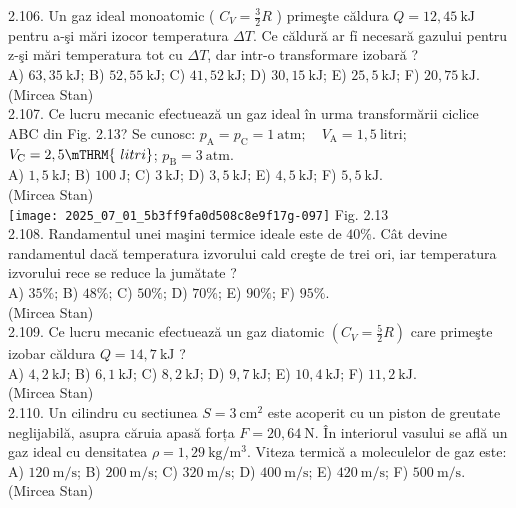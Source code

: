 2.106. Un gaz ideal monoatomic ( $C_{V}=\frac{3}{2} R$ ) primeşte căldura $Q=12,45 \mathrm{~kJ}$ pentru a-şi mări izocor temperatura $\Delta T$. Ce căldură ar fỉ necesară gazului pentru z-şi mări temperatura tot cu $\Delta T$, dar intr-o transformare izobară ?\\ A) $63,35 \mathrm{~kJ}$; B) $52,55 \mathrm{~kJ}$; C) $41,52 \mathrm{~kJ}$; D) $30,15 \mathrm{~kJ}$; E) $25,5 \mathrm{~kJ}$; F) $20,75 \mathrm{~kJ}$.\\ (Mircea Stan)\\

2.107. Ce lucru mecanic efectuează un gaz ideal în urma transformării ciclice ABC din Fig. 2.13? Se cunosc: $p_{\mathrm{A}}=p_{\mathrm{C}}=1 \mathrm{~atm} ; \quad V_{\mathrm{A}}=1,5 \mathrm{~litri}$; $V_{\mathrm{C}}=2,5 \mTHRM{~litri}$; $p_{\mathrm{B}}=3 \mathrm{~atm}$.\\ A) $1,5 \mathrm{~kJ}$; B) $100 \mathrm{~J}$; C) $3 \mathrm{~kJ}$; D) $3,5 \mathrm{~kJ}$; E) $4,5 \mathrm{~kJ}$; F) $5,5 \mathrm{~kJ}$.\\ (Mircea Stan)\\ \texttt{[image: 2025\_07\_01\_5b3ff9fa0d508c8e9f17g-097]} Fig. 2.13\\

2.108. Randamentul unei maşini termice ideale este de $40 \%$. Cât devine randamentul dacă temperatura izvorului cald creşte de trei ori, iar temperatura izvorului rece se reduce la jumătate ?\\ A) $35 \%$; B) $48 \%$; C) $50 \%$; D) $70 \%$; E) $90 \%$; F) $95 \%$.\\ (Mircea Stan)\\

2.109. Ce lucru mecanic efectuează un gaz diatomic $\left(C_{V}=\frac{5}{2} R\right)$ care primeşte izobar căldura $Q=14,7 \mathrm{~kJ}$ ?\\ A) $4,2 \mathrm{~kJ}$; B) $6,1 \mathrm{~kJ}$; C) $8,2 \mathrm{~kJ}$; D) $9,7 \mathrm{~kJ}$; E) $10,4 \mathrm{~kJ}$; F) $11,2 \mathrm{~kJ}$.\\ (Mircea Stan)\\

2.110. Un cilindru cu sectiunea $S=3 \mathrm{~cm}^{2}$ este acoperit cu un piston de greutate neglijabilă, asupra căruia apasă forța $F=20,64 \mathrm{~N}$. În interiorul vasului se află un gaz ideal cu densitatea $\rho=1,29 \mathrm{~kg} / \mathrm{m}^{3}$. Viteza termică a moleculelor de gaz este:\\ A) $120 \mathrm{~m} / \mathrm{s}$; B) $200 \mathrm{~m} / \mathrm{s}$; C) $320 \mathrm{~m} / \mathrm{s}$; D) $400 \mathrm{~m} / \mathrm{s}$; E) $420 \mathrm{~m} / \mathrm{s}$; F) $500 \mathrm{~m} / \mathrm{s}$.\\ (Mircea Stan)\\

